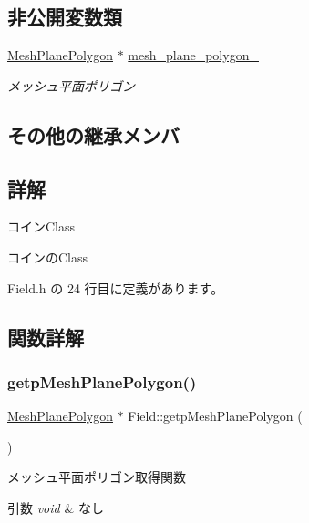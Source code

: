 \subsection*{非公開変数類}
\begin{DoxyCompactItemize}
\item 
\mbox{\hyperlink{class_mesh_plane_polygon}{Mesh\+Plane\+Polygon}} $\ast$ \mbox{\hyperlink{class_field_a5c4ad4d2fea2269e7ab2185cf09beb10}{mesh\+\_\+plane\+\_\+polygon\+\_\+}}
\begin{DoxyCompactList}\small\item\em メッシュ平面ポリゴン \end{DoxyCompactList}\end{DoxyCompactItemize}
\subsection*{その他の継承メンバ}


\subsection{詳解}
コイン\+Class 

コインの\+Class 

 Field.\+h の 24 行目に定義があります。



\subsection{関数詳解}
\mbox{\label{class_field_ac3603afd80f48bb6bf62752a621578f3}} 
\subsubsection{\texorpdfstring{getp\+Mesh\+Plane\+Polygon()}{getpMeshPlanePolygon()}}
{\footnotesize\ttfamily \mbox{\hyperlink{class_mesh_plane_polygon}{Mesh\+Plane\+Polygon}} $\ast$ Field\+::getp\+Mesh\+Plane\+Polygon (\begin{DoxyParamCaption}{ }\end{DoxyParamCaption})}



メッシュ平面ポリゴン取得関数 


\begin{DoxyParams}{引数}
{\em void} & なし \\
\hline
\end{DoxyParams}

